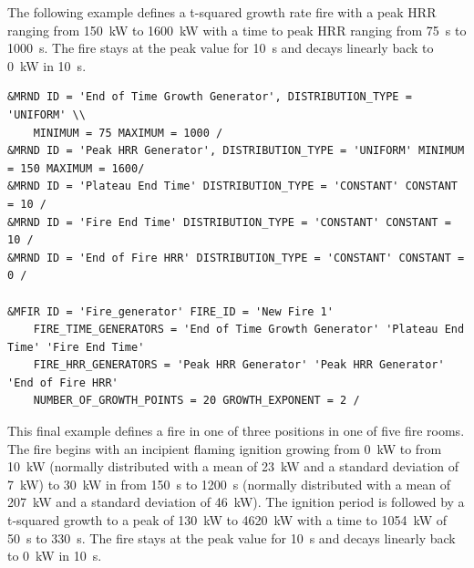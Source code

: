 \documentclass[12pt,twoside]{book}
\begin{document}
The following example defines a t-squared growth rate fire with a peak HRR ranging from 150~kW to 1600~kW with a time to peak HRR ranging from 75~s to 1000~s. The fire stays at the peak value for 10~s and decays linearly back to 0~kW in 10~s.

\begin{lstlisting}[language=cdata, basicstyle=\scriptsize]
&MRND ID = 'End of Time Growth Generator', DISTRIBUTION_TYPE = 'UNIFORM' \\
    MINIMUM = 75 MAXIMUM = 1000 /
&MRND ID = 'Peak HRR Generator', DISTRIBUTION_TYPE = 'UNIFORM' MINIMUM = 150 MAXIMUM = 1600/
&MRND ID = 'Plateau End Time' DISTRIBUTION_TYPE = 'CONSTANT' CONSTANT = 10 /
&MRND ID = 'Fire End Time' DISTRIBUTION_TYPE = 'CONSTANT' CONSTANT = 10 /
&MRND ID = 'End of Fire HRR' DISTRIBUTION_TYPE = 'CONSTANT' CONSTANT = 0 /

&MFIR ID = 'Fire_generator' FIRE_ID = 'New Fire 1'
	FIRE_TIME_GENERATORS = 'End of Time Growth Generator' 'Plateau End Time' 'Fire End Time'
	FIRE_HRR_GENERATORS = 'Peak HRR Generator' 'Peak HRR Generator' 'End of Fire HRR'
	NUMBER_OF_GROWTH_POINTS = 20 GROWTH_EXPONENT = 2 /
\end{lstlisting}

This final example defines a fire in one of three positions in one of five fire rooms. The fire begins with an incipient flaming ignition growing from 0~kW to from 10~kW (normally distributed with a mean of 23~kW and a standard deviation of 7~kW) to 30~kW in from 150~s to 1200~s (normally distributed with a mean of 207~kW and a standard deviation of 46~kW). The ignition period is followed by a t-squared growth to a peak of 130~kW to 4620~kW with a time to 1054~kW of 50~s to 330~s. The fire stays at the peak value for 10~s and decays linearly back to 0~kW in 10~s.
\end{document}
